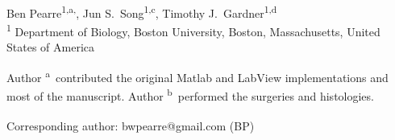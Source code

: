 \documentclass[10pt,letterpaper]{article}
\date{}
\begin{document}
\vspace*{0.35in}

\begin{flushleft}
{\Large
  \textbf{}
}
\newline
\\
Ben Pearre\textsuperscript{1,a,\textcurrency},
Jun S.~Song\textsuperscript{1,c},
Timothy J.~Gardner\textsuperscript{1,d}
\\
\bigskip
\textsuperscript{1} Department of Biology, Boston University, Boston, Massachusetts, United States of America
\\
\bigskip

% 
%
Author \textsuperscript{a}~contributed the original Matlab and LabView implementations and most of the manuscript. Author \textsuperscript{b}~performed the surgeries and histologies.





\textsuperscript{\textcurrency} Corresponding author: bwpearre@gmail.com (BP)

\end{flushleft}
\end{document}
